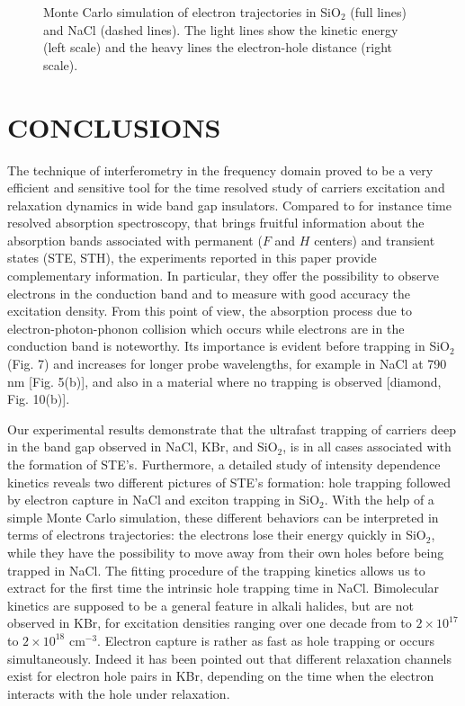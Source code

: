 \documentclass[aps,prb,reprint]{revtex4-2}
\begin{document}
\begin{figure}[ht]
    \centering
    \caption{Monte Carlo simulation of electron trajectories in SiO$_2$ (full lines) and NaCl (dashed lines). The light lines show the kinetic energy (left scale) and the heavy lines the electron-hole distance (right scale).}
    \label{fig:montecarlo}
\end{figure}

\section{CONCLUSIONS}

The technique of interferometry in the frequency domain proved to be a very efficient and sensitive tool for the time resolved study of carriers excitation and relaxation dynamics in wide band gap insulators. Compared to for instance time resolved absorption spectroscopy, that brings fruitful information about the absorption bands associated with permanent ($F$ and $H$ centers) and transient states (STE, STH), the experiments reported in this paper provide complementary information. In particular, they offer the possibility to observe electrons in the conduction band and to measure with good accuracy the excitation density. From this point of view, the absorption process due to electron-photon-phonon collision which occurs while electrons are in the conduction band is noteworthy. Its importance is evident before trapping in SiO$_2$ (Fig. 7) and increases for longer probe wavelengths, for example in NaCl at 790 nm [Fig. 5(b)], and also in a material where no trapping is observed [diamond, Fig. 10(b)].

Our experimental results demonstrate that the ultrafast trapping of carriers deep in the band gap observed in NaCl, KBr, and SiO$_2$, is in all cases associated with the formation of STE's. Furthermore, a detailed study of intensity dependence kinetics reveals two different pictures of STE's formation: hole trapping followed by electron capture in NaCl and exciton trapping in SiO$_2$. With the help of a simple Monte Carlo simulation, these different behaviors can be interpreted in terms of electrons trajectories: the electrons lose their energy quickly in SiO$_2$, while they have the possibility to move away from their own holes before being trapped in NaCl. The fitting procedure of the trapping kinetics allows us to extract for the first time the intrinsic hole trapping time in NaCl. Bimolecular kinetics are supposed to be a general feature in alkali halides, but are not observed in KBr, for excitation densities ranging over one decade from to $2\times 10^{17}$ to $2\times 10^{18}$ cm$^{-3}$. Electron capture is rather as fast as hole trapping or occurs simultaneously. Indeed it has been pointed out that different relaxation channels exist for electron hole pairs in KBr, depending on the time when the electron interacts with the hole under relaxation.\cite{2}
\end{document}
